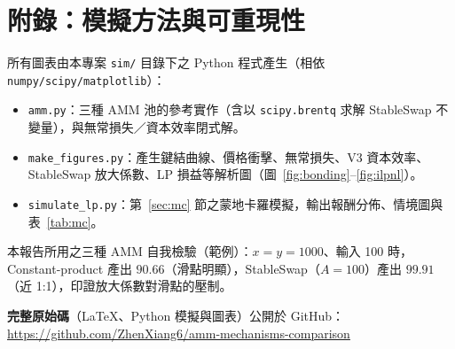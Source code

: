 \documentclass[11pt,a4paper]{article}
\begin{document}
\section*{附錄：模擬方法與可重現性}
所有圖表由本專案 \texttt{sim/} 目錄下之 Python 程式產生（相依 \texttt{numpy/scipy/matplotlib}）：
\begin{itemize}\setlength{\itemsep}{1pt}
  \item \texttt{amm.py}：三種 AMM 池的參考實作（含以 \texttt{scipy.brentq} 求解 StableSwap 不變量），與無常損失／資本效率閉式解。
  \item \texttt{make\_figures.py}：產生鍵結曲線、價格衝擊、無常損失、V3 資本效率、StableSwap 放大係數、LP 損益等解析圖（圖~\ref{fig:bonding}--\ref{fig:ilpnl}）。
  \item \texttt{simulate\_lp.py}：第~\ref{sec:mc} 節之蒙地卡羅模擬，輸出報酬分佈、情境圖與表~\ref{tab:mc}。
\end{itemize}
本報告所用之三種 AMM 自我檢驗（範例）：$x{=}y{=}1000$、輸入 100 時，Constant-product 產出 $90.66$（滑點明顯），StableSwap（$A{=}100$）產出 $99.91$（近 1:1），印證放大係數對滑點的壓制。

\medskip\noindent\textbf{完整原始碼}（LaTeX、Python 模擬與圖表）公開於 GitHub：\\
\url{https://github.com/ZhenXiang6/amm-mechanisms-comparison}



\end{document}
